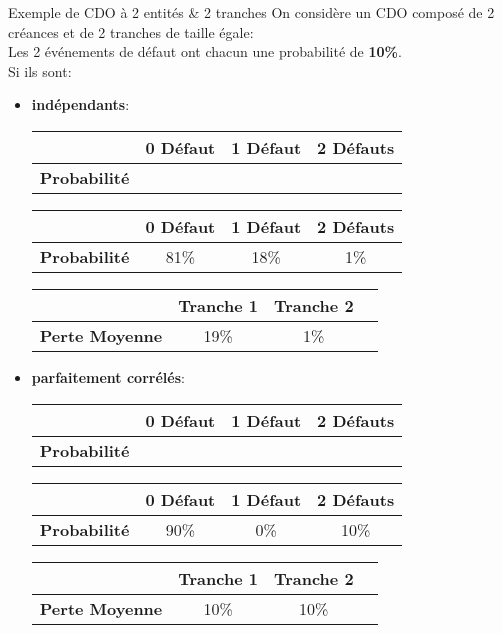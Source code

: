 \documentclass{beamer}
\begin{document}
\begin{frame}{Exemple de CDO à 2 entités \& 2 tranches}
On considère un CDO composé de 2 créances et de 2 tranches de taille égale:\\
Les 2 événements de défaut ont chacun une probabilité de \textbf{10\%}.\\
Si ils sont:\\
\begin{itemize}
\item  \textbf{indépendants}:\\
\vspace{0.25cm}
\begin{overprint}
\begin{tabular}{|l|c|c|c|}
\hline
&\textbf{0 Défaut}&\textbf{1 Défaut}&\textbf{2 Défauts}\\
\hline
\textbf{Probabilité}&&&\\
\hline
\end{tabular}
\begin{tabular}{|l|c|c|c|}
\hline
&\textbf{0 Défaut}&\textbf{1 Défaut}&\textbf{2 Défauts}\\
\hline
\textbf{Probabilité}&81\%&18\%&1\%\\
\hline
\end{tabular}
\begin{tabular}{|l|c|c|c|}
\hline
&\textbf{Tranche 1}&\textbf{Tranche 2}\\
\hline
\textbf{Perte Moyenne}&19\%&1\%\\
\hline
\end{tabular}
\end{overprint}
\vspace{0.25cm}
\item \textbf{parfaitement corrélés}:\\
\vspace{0.25cm}
\begin{overprint}
\begin{tabular}{|l|c|c|c|}
\hline
&\textbf{0 Défaut}&\textbf{1 Défaut}&\textbf{2 Défauts}\\
\hline
\textbf{Probabilité}&&&\\
\hline
\end{tabular}
\begin{tabular}{|l|c|c|c|}
\hline
&\textbf{0 Défaut}&\textbf{1 Défaut}&\textbf{2 Défauts}\\
\hline
\textbf{Probabilité}&90\%&0\%&10\%\\
\hline
\end{tabular}
\begin{tabular}{|l|c|c|c|}
\hline
&\textbf{Tranche 1}&\textbf{Tranche 2}\\
\hline
\textbf{Perte Moyenne}&10\%&10\%\\
\hline
\end{tabular}
\end{overprint}

\end{itemize}
\end{frame}
\end{document}
